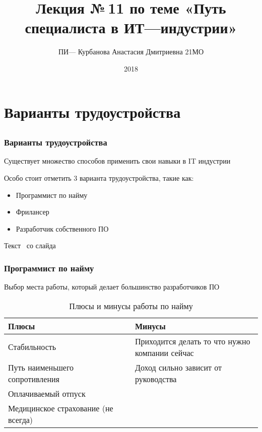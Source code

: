 \documentclass{../industrial-development}
\title{ Лекция №\,11 по теме «Путь специалиста в ИТ---индустрии»}
\author{ПИ--- Курбанова Анастасия Дмитриевна 21МО }
\date{2018}
\begin{document}
\begin{frame}
  \titlepage
\end{frame}

\section{Варианты трудоустройства }

\subsection{}

\begin{frame} \frametitle{Варианты трудоустройства}
  \begin{block}{}
  Существует множество способов применить свои навыки в IT индустрии
  \end{block}

  \bigskip
Особо стоит отметить 3 варианта трудоустройства, такие как:
  
  \begin{itemize}
  \item Программист по найму
  \item Фрилансер
  \item Разработчик собственного ПО
  \end{itemize}
\end{frame}

\lecturenotes

Текст~\cite[с.~62--67]{Sonmez} со слайда

\begin{frame} \frametitle{Программист по найму}
  \begin{block}{}
    Выбор места работы, который делает большинство разработчиков ПО 
  \end{block}
  
\begin{table}[H]
\caption{\label{tab:canonsummary} Плюсы и минусы работы по найму}
\begin{center}
\begin{tabular}{|p{0.5\linewidth}|p{0.5\linewidth}|}
\hline
\textbf{Плюсы} & \textbf{Минусы} \\
\hline
Стабильность &  Приходится делать то что нужно компании сейчас \\
\hline
Путь наименьшего сопротивления  & Доход сильно зависит от руководства \\
\hline
Оплачиваемый отпуск & \\
\hline
Медицинское страхование (не всегда) & \\
\hline
\end{tabular}
\end{center}
\end{table} 

\end{frame}
\end{document}
